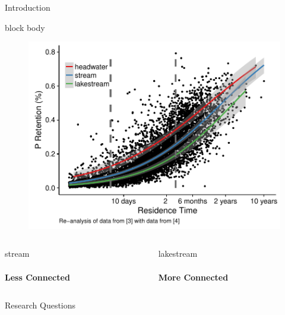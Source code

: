 \documentclass[final,hyperref={pdfpagelabels=false}]{beamer}
\begin{document}
\begin{frame}[t]
\begin{columns}[t]
\begin{column}{.465\textwidth}
\begin{block}{Introduction}
\vspace{1em}
{
\begin{beamercolorbox}[wd=\textwidth,rounded=true]{block body}
   \begin{figure}
      \includegraphics[width=\linewidth]{milstead_multi.pdf}
   \end{figure}
\end{beamercolorbox}
}

\vspace{1.4em}

\begin{columns}

\begin{column}{0.5\textwidth}
\centering
\large stream \\
\vspace{0.5em}
 \\
\textbf{Less Connected}
\end{column}

\begin{column}{0.5\textwidth}
\centering
\large lakestream \\
\vspace{0.5em}
 \\
\textbf{More Connected}
\end{column}
\end{columns}
\vspace{0.3em}

\vspace{0.5em}
\end{block}
\vspace{1em}
\begin{block}{Research Questions}


\end{block}
\end{column}
\end{columns}
\end{frame}
\end{document}
